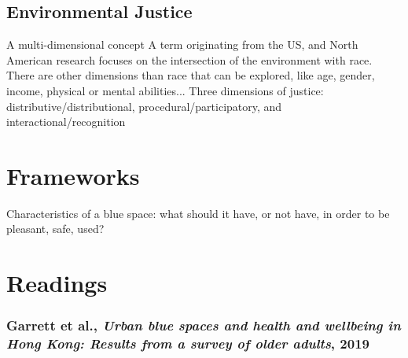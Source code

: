 \documentclass{article}
\begin{document}
\subsection{Environmental Justice}

\begin{outline}
	\1 A multi-dimensional concept
	\1 A term originating from the US, and North American research focuses on the intersection of the environment with race. There are other dimensions than race that can be explored, like age, gender, income, physical or mental abilities...
	\1 Three dimensions of justice: distributive/distributional, procedural/participatory, and interactional/recognition \parencite{kronenberg2020environmental}
\end{outline}

\section{Frameworks}

\begin{outline}
	\1 Characteristics of a blue space: what should it have, or not have, in order to be pleasant, safe, used? \parencite{}
\end{outline}




\section{Readings}

\subsubsection{Garrett et al., \textit{Urban blue spaces and health and wellbeing in Hong Kong: Results from a survey of older adults}, 2019} \parencite{garrett2019urban}
\end{document}
